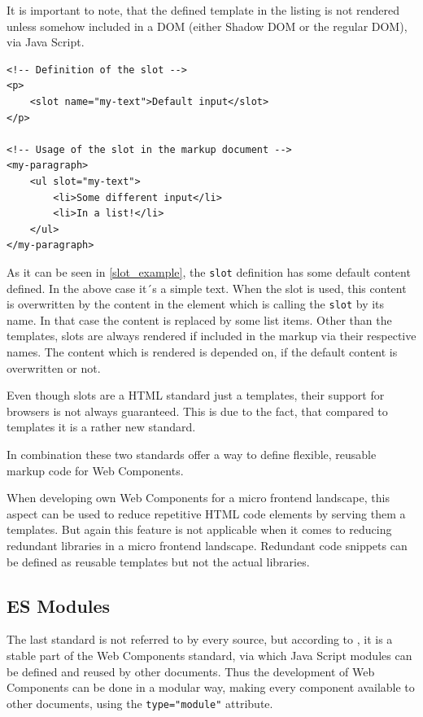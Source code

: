 It is important to note, that the defined template in the listing is not rendered unless somehow included in a DOM (either Shadow DOM or the regular DOM), via Java Script.

\begin{lstlisting}[language=HTML5, caption=Definition and usage of the \texttt{slot} standard \cite{wc_html_template_slots}, label=slot_example]
<!-- Definition of the slot -->
<p>
	<slot name="my-text">Default input</slot>
</p>

<!-- Usage of the slot in the markup document -->
<my-paragraph>
	<ul slot="my-text">
		<li>Some different input</li>
		<li>In a list!</li>
	</ul>
</my-paragraph>
\end{lstlisting}

As it can be seen in \ref{slot_example}, the \texttt{slot} definition has some default content defined. In the above case it´s a simple text. When the slot is used, this content is overwritten by the content in the element which is calling the \texttt{slot} by its name.
In that case the content is replaced by some list items.
Other than the templates, slots are always rendered if included in the markup via their respective names. The content which is rendered is depended on, if the default content is overwritten or not.

Even though slots are a HTML standard just a templates, their support for browsers is not always guaranteed. This is due to the fact, that compared to templates it is a rather new standard.

In combination these two standards offer a way to define flexible, reusable markup code for Web Components.\cite{wc_html_template_slots} 

When developing own Web Components for a micro frontend landscape, this aspect can be used to reduce repetitive HTML code elements by serving them a templates. But again this feature is not applicable when it comes to reducing redundant libraries in a micro frontend landscape. Redundant code snippets can be defined as reusable templates but not the actual libraries.

\subsection{ES Modules}

The last standard is not referred to by every source, but according to \cite{wc_specifications}, it is a stable part of the Web Components standard, via which Java Script modules can be defined and reused by other documents.
Thus the development of Web Components can be done in a modular way, making every component available to other documents, using the \texttt{type="module"} attribute.

